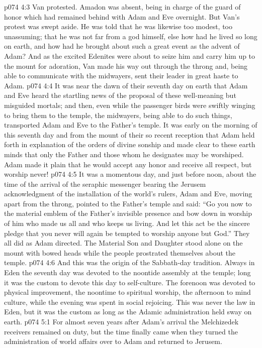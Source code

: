 \vs p074 4:3 Van protested. Amadon was absent, being in charge of the guard of honor which had remained behind with Adam and Eve overnight. But Van’s protest was swept aside. He was told that he was likewise too modest, too unassuming; that he was not far from a god himself, else how had he lived so long on earth, and how had he brought about such a great event as the advent of Adam? And as the excited Edenites were about to seize him and carry him up to the mount for adoration, Van made his way out through the throng and, being able to communicate with the midwayers, sent their leader in great haste to Adam.
\vs p074 4:4 It was near the dawn of their seventh day on earth that Adam and Eve heard the startling news of the proposal of these well\hyp{}meaning but misguided mortals; and then, even while the passenger birds were swiftly winging to bring them to the temple, the midwayers, being able to do such things, transported Adam and Eve to the Father’s temple. It was early on the morning of this seventh day and from the mount of their so recent reception that Adam held forth in explanation of the orders of divine sonship and made clear to these earth minds that only the Father and those whom he designates may be worshiped. Adam made it plain that he would accept any honor and receive all respect, but worship never!
\vs p074 4:5 It was a momentous day, and just before noon, about the time of the arrival of the seraphic messenger bearing the Jerusem acknowledgment of the installation of the world’s rulers, Adam and Eve, moving apart from the throng, pointed to the Father’s temple and said: “Go you now to the material emblem of the Father’s invisible presence and bow down in worship of him who made us all and who keeps us living. And let this act be the sincere pledge that you never will again be tempted to worship anyone but God.” They all did as Adam directed. The Material Son and Daughter stood alone on the mount with bowed heads while the people prostrated themselves about the temple.
\pc \vs p074 4:6 And this was the origin of the Sabbath\hyp{}day tradition. Always in Eden the seventh day was devoted to the noontide assembly at the temple; long it was the custom to devote this day to self\hyp{}culture. The forenoon was devoted to physical improvement, the noontime to spiritual worship, the afternoon to mind culture, while the evening was spent in social rejoicing. This was never the law in Eden, but it was the custom as long as the Adamic administration held sway on earth.
\vs p074 5:1 For almost seven years after Adam’s arrival the Melchizedek receivers remained on duty, but the time finally came when they turned the administration of world affairs over to Adam and returned to Jerusem.
